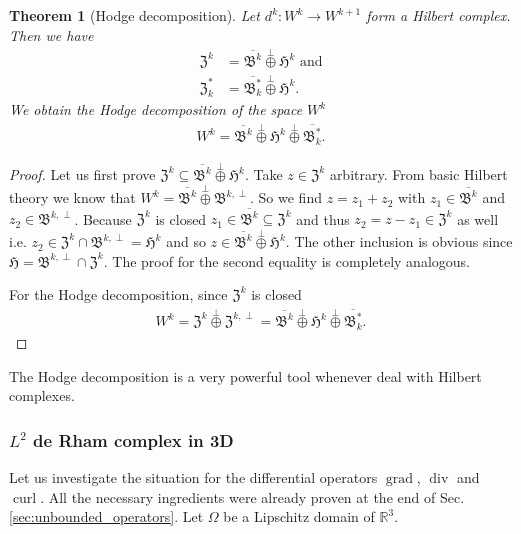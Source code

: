 \documentclass[12pt,a4paper]{article}
\numberwithin{equation}{subsection}
\numberwithin{lemma}{subsection}
\newtheorem{theorem}[lemma]{Theorem}
\theoremstyle{definition}
\DeclareMathOperator{\curl}{curl}
\DeclareMathOperator{\diver}{div}
\DeclareMathOperator{\grad}{grad}
\newcommand{\real}{\mathbb{R}}
\begin{document}
\begin{theorem}[Hodge decomposition]\label{thm:hodge_decomposition}
    Let $d^k: W^k \rightarrow W^{k+1}$ form a Hilbert complex. 
    Then we have
    \begin{align*}
        \mathfrak{Z}^k &= \overline{\mathfrak{B}^k} \stackrel{\perp}{\oplus}
            \mathfrak{H}^k \text{ and}
        \\ \mathfrak{Z}^*_k &= 
            \overline{\mathfrak{B}^*_k} \stackrel{\perp}{\oplus}
            \mathfrak{H}^k.
    \end{align*}
    We obtain the Hodge decomposition of the space $W^k$
    \begin{align*}
        W^k = \overline{\mathfrak{B}^k} \stackrel{\perp}{\oplus}
            \mathfrak{H}^k \stackrel{\perp}{\oplus} \overline{\mathfrak{B}^*_k}.
    \end{align*}
\end{theorem}
\begin{proof}
    Let us first prove $\mathfrak{Z}^k \subseteq 
    \overline{\mathfrak{B}^k} \stackrel{\perp}{\oplus} \mathfrak{H}^k$.
    Take $z \in \mathfrak{Z}^k$ arbitrary. 
    From basic Hilbert theory we know that 
    $W^k = \overline{\mathfrak{B}^k} \stackrel{\perp}{\oplus} 
    \mathfrak{B}^{k,\perp}$. So we find $z = z_1 + z_2$ with
    $z_1 \in \overline{\mathfrak{B}^k}$ and $z_2 \in 
    \mathfrak{B}^{k,\perp}$. 
    Because $\mathfrak{Z}^k$ is closed 
    $z_1 \in \overline{\mathfrak{B}^k} \subseteq \mathfrak{Z}^k$ 
    and thus $z_2 = z - z_1 \in \mathfrak{Z}^k$ as well i.e. $z_2 \in \mathfrak{Z}^k 
    \cap \mathfrak{B}^{k,\perp} = \mathfrak{H}^k$ and so 
    $z \in \overline{\mathfrak{B}^k} \stackrel{\perp}{\oplus}
    \mathfrak{H}^k$. The other inclusion is obvious since 
    $\mathfrak{H} = \mathfrak{B}^{k,\perp} \cap \mathfrak{Z}^k$.
    The proof for the second equality is completely analogous. 

    For the Hodge decomposition, since $\mathfrak{Z}^k$ is closed 
    \begin{align*}
        W^k = \mathfrak{Z}^k \stackrel{\perp}{\oplus} \mathfrak{Z}^{k,\perp}
        =  \overline{\mathfrak{B}^k} \stackrel{\perp}{\oplus}
            \mathfrak{H}^k \stackrel{\perp}{\oplus} \overline{\mathfrak{B}^*_k}.
    \end{align*}
\end{proof}
The Hodge decomposition is a very powerful tool whenever deal with Hilbert
complexes.

\subsubsection{$L^2$ de Rham complex in 3D}
Let us investigate the situation for the differential operators 
$\grad$, $\diver$ and $\curl$. All the necessary ingredients were already 
proven at the end of Sec.\,\ref{sec:unbounded_operators}. 
Let $\Omega$ be a Lipschitz domain of 
$\real^3$. %
\end{document}
